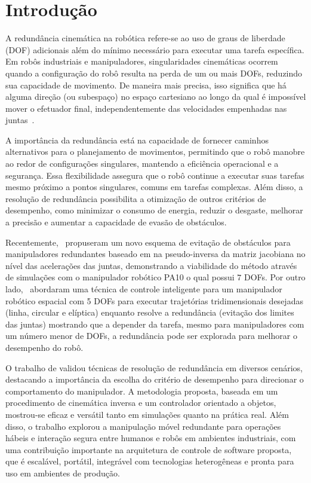\chapter{Introdução}\label{cap:introduction}

A redundância cinemática na robótica refere-se ao uso de graus de liberdade (DOF) adicionais além do mínimo necessário para executar uma
tarefa específica. Em robôs industriais e manipuladores, singularidades cinemáticas ocorrem quando a configuração do robô resulta na perda
de um ou mais DOFs, reduzindo sua capacidade de movimento. De maneira mais precisa, isso significa que há alguma direção (ou subespaço) 
no espaço cartesiano ao longo da qual é impossível mover o efetuador final, independentemente das velocidades empenhadas nas 
juntas~\cite{craig2004}. 

A importância da redundância está na capacidade de fornecer caminhos alternativos para o planejamento de movimentos,
permitindo que o robô manobre ao redor de configurações singulares, mantendo a eficiência operacional e a segurança. Essa flexibilidade 
assegura que o robô continue a executar suas tarefas mesmo próximo a pontos singulares, comuns em tarefas complexas. Além disso, a resolução
de redundância possibilita a otimização de outros critérios de desempenho, como minimizar o consumo de energia, reduzir o desgaste, melhorar 
a precisão e aumentar a capacidade de evasão de obstáculos.

Recentemente,~\cite{li2023pseudo} propuseram um novo esquema de evitação de obstáculos para manipuladores redundantes 
baseado em na pseudo-inversa da matriz jacobiana no nível das acelerações das juntas, demonstrando a viabilidade do método através de simulações 
com o manipulador robótico PA10 o qual possui \(7\) DOFs. Por outro lado,~\cite{kuri2023som}
abordaram uma técnica de controle inteligente para um manipulador robótico espacial com 5 DOFs para executar
trajetórias tridimensionais desejadas (linha, circular e elíptica) enquanto resolve a redundância 
(evitação dos limites das juntas) mostrando que a depender da tarefa, mesmo para manipuladores com um número menor de DOFs, 
a redundância pode ser explorada para melhorar o desempenho do robô.

O trabalho de \cite{ancona2017} validou técnicas de resolução de redundância em diversos cenários, destacando a importância da escolha do critério de desempenho
para direcionar o comportamento do manipulador. A metodologia proposta, baseada em um procedimento de cinemática inversa e um controlador orientado a objetos,
mostrou-se eficaz e versátil tanto em simulações quanto na prática real. Além disso, o trabalho explorou a manipulação móvel redundante para operações hábeis 
e interação segura entre humanos e robôs em ambientes industriais, com uma contribuição importante na arquitetura de controle de software proposta, que é escalável,
portátil, integrável com tecnologias heterogêneas e pronta para uso em ambientes de produção.

